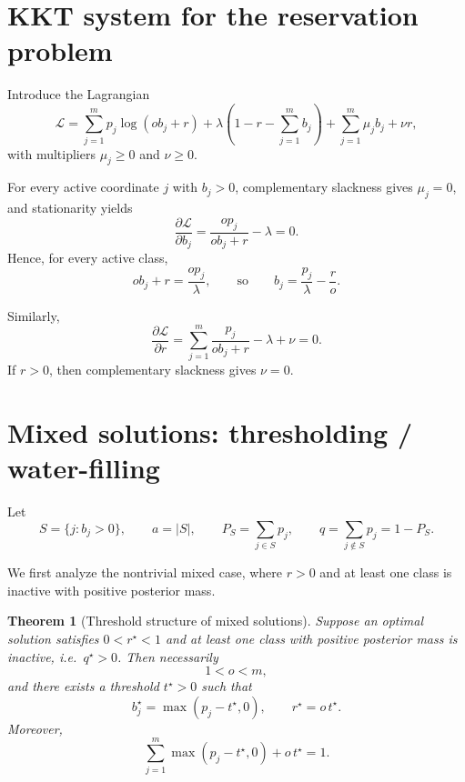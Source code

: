 \documentclass[11pt]{article}
\newtheorem{theorem}{Theorem}
\theoremstyle{remark}
\begin{document}
\section{KKT system for the reservation problem}

Introduce the Lagrangian
\begin{equation}
\mathcal L
=
\sum_{j=1}^{m} p_j \log(o b_j+r)
+\lambda\left(1-r-\sum_{j=1}^{m} b_j\right)
+\sum_{j=1}^{m}\mu_j b_j
+\nu r,
\label{eq:lagrangian}
\end{equation}
with multipliers $\mu_j\ge 0$ and $\nu\ge 0$.

For every active coordinate $j$ with $b_j>0$, complementary slackness gives $\mu_j=0$, and stationarity yields
\begin{equation}
\frac{\partial \mathcal L}{\partial b_j}
=
\frac{o p_j}{o b_j+r}-\lambda
=
0.
\label{eq:stationary_b}
\end{equation}
Hence, for every active class,
\begin{equation}
o b_j+r=\frac{o p_j}{\lambda},
\qquad\text{so}\qquad
b_j=\frac{p_j}{\lambda}-\frac{r}{o}.
\label{eq:active_form}
\end{equation}

Similarly,
\begin{equation}
\frac{\partial \mathcal L}{\partial r}
=
\sum_{j=1}^{m}\frac{p_j}{o b_j+r}-\lambda+\nu
=
0.
\label{eq:stationary_r}
\end{equation}
If $r>0$, then complementary slackness gives $\nu=0$.

\section{Mixed solutions: thresholding / water-filling}

Let
\[
S=\{j:b_j>0\},
\qquad
a=|S|,
\qquad
P_S=\sum_{j\in S}p_j,
\qquad
q=\sum_{j\notin S}p_j=1-P_S.
\]

We first analyze the nontrivial mixed case, where $r>0$ and at least one class is inactive with positive posterior mass.

\begin{theorem}[Threshold structure of mixed solutions]
Suppose an optimal solution satisfies $0<r^\star<1$ and at least one class with positive posterior mass is inactive, i.e.\ $q^\star>0$. Then necessarily
\[
1<o<m,
\]
and there exists a threshold $t^\star>0$ such that
\begin{equation}
b_j^\star=\max(p_j-t^\star,0),
\qquad
r^\star=o\,t^\star.
\label{eq:threshold_solution}
\end{equation}
Moreover,
\begin{equation}
\sum_{j=1}^{m}\max(p_j-t^\star,0)+o\,t^\star=1.
\label{eq:threshold_equation}
\end{equation}
\end{theorem}
\end{document}
